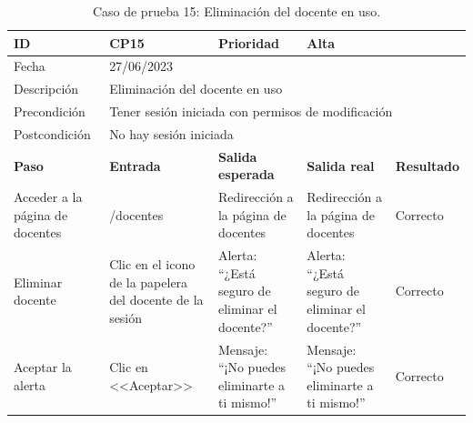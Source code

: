 \begin{table}[H]
\begin{tabular}{p{} p{} p{} p{} p{}}
\cellcolor{gray!25}
ID   & CP15 & \cellcolor{gray!25} Prioridad   & Alta \\ \hline
\cellcolor{gray!25} Fecha	&	\multicolumn{4}{l}{27/06/2023} \\ \hline
\cellcolor{gray!25} Descripción		&	\multicolumn{4}{l}{Eliminación del docente en uso} \\ \hline                                            
\cellcolor{gray!25}
Precondición  & \multicolumn{4}{p{.66\textwidth}}{Tener sesión iniciada con permisos de modificación} \\ \hline
\cellcolor{gray!25} Postcondición & \multicolumn{4}{l}{No hay sesión iniciada}                                                    \\ \hline
\rowcolor{gray!25}
\textbf{Paso}   & \textbf{Entrada} & \textbf{Salida esperada} & \textbf{Salida real} & \textbf{Resultado} \\ \hline
Acceder a la página de docentes 
& /docentes                                                                          
& Redirección a la página de docentes                                   
& Redirección a la página de docentes                                   
& Correcto                            
\\ \hline
Eliminar docente
& Clic en el icono de la papelera del docente de la sesión
& Alerta: ``¿Está seguro de eliminar el docente?''
& Alerta: ``¿Está seguro de eliminar el docente?''
& Correcto
\\ \hline
Aceptar la alerta
& Clic en <<Aceptar>>
& Mensaje: ``¡No puedes eliminarte a ti mismo!''                      
& Mensaje: ``¡No puedes eliminarte a ti mismo!''   
& Correcto                            
\\ \hline              
\end{tabular}
\caption{Caso de prueba 15: Eliminación del docente en uso.}
\end{table}

